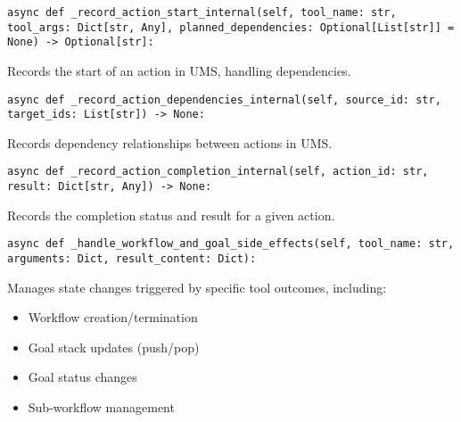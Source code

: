 \documentclass[12pt,a4paper]{article}
\begin{document}
\begin{pageablecode}
\begin{verbatim}
async def _record_action_start_internal(self, tool_name: str, tool_args: Dict[str, Any], planned_dependencies: Optional[List[str]] = None) -> Optional[str]:
\end{verbatim}
\end{pageablecode}
Records the start of an action in UMS, handling dependencies.

\begin{pageablecode}
\begin{verbatim}
async def _record_action_dependencies_internal(self, source_id: str, target_ids: List[str]) -> None:
\end{verbatim}
\end{pageablecode}
Records dependency relationships between actions in UMS.

\begin{pageablecode}
\begin{verbatim}
async def _record_action_completion_internal(self, action_id: str, result: Dict[str, Any]) -> None:
\end{verbatim}
\end{pageablecode}
Records the completion status and result for a given action.

\begin{pageablecode}
\begin{verbatim}
async def _handle_workflow_and_goal_side_effects(self, tool_name: str, arguments: Dict, result_content: Dict):
\end{verbatim}
\end{pageablecode}
Manages state changes triggered by specific tool outcomes, including:
\begin{itemize}
    \item Workflow creation/termination
    \item Goal stack updates (push/pop)
    \item Goal status changes
    \item Sub-workflow management
\end{itemize}
\end{document}

